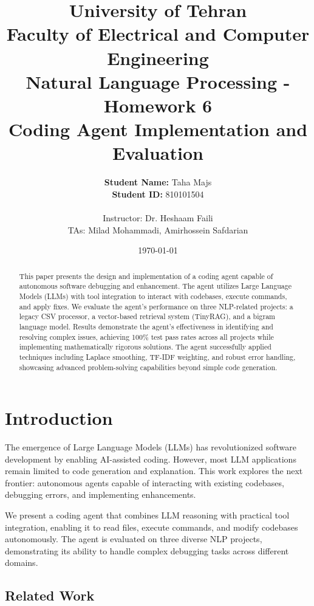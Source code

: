 \documentclass[12pt, a4paper]{article}
\title{
    \vspace{-2cm}
    \textbf{University of Tehran}\\
    Faculty of Electrical and Computer Engineering\\
    \vspace{0.5cm}
    \textbf{Natural Language Processing - Homework 6}\\
    \large Coding Agent Implementation and Evaluation
}
\author{
    \textbf{Student Name:} Taha Majs \\
    \textbf{Student ID:} 810101504 \\
    \vspace{0.5cm} \\
    \small Instructor: Dr. Heshaam Faili\\
    \small TAs: Milad Mohammadi, Amirhossein Safdarian
}
\date{\today}
\begin{document}
\maketitle
\begin{abstract}
This paper presents the design and implementation of a coding agent capable of autonomous software debugging and enhancement. The agent utilizes Large Language Models (LLMs) with tool integration to interact with codebases, execute commands, and apply fixes. We evaluate the agent's performance on three NLP-related projects: a legacy CSV processor, a vector-based retrieval system (TinyRAG), and a bigram language model. Results demonstrate the agent's effectiveness in identifying and resolving complex issues, achieving 100\% test pass rates across all projects while implementing mathematically rigorous solutions. The agent successfully applied techniques including Laplace smoothing, TF-IDF weighting, and robust error handling, showcasing advanced problem-solving capabilities beyond simple code generation.
\end{abstract}
\newpage

\tableofcontents
\newpage

\section{Introduction}

The emergence of Large Language Models (LLMs) has revolutionized software development by enabling AI-assisted coding. However, most LLM applications remain limited to code generation and explanation. This work explores the next frontier: autonomous agents capable of interacting with existing codebases, debugging errors, and implementing enhancements.

We present a coding agent that combines LLM reasoning with practical tool integration, enabling it to read files, execute commands, and modify codebases autonomously. The agent is evaluated on three diverse NLP projects, demonstrating its ability to handle complex debugging tasks across different domains.

\subsection{Related Work}
\end{document}
